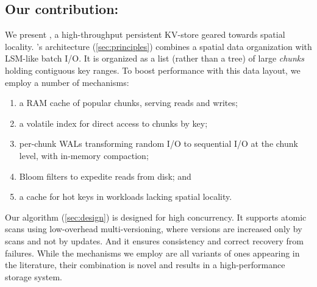 \subsection{Our contribution: \sys}

We present \sys, a high-throughput persistent KV-store geared towards spatial locality. 
\sys's  architecture (\cref{sec:principles}) 
combines a spatial data organization with LSM-like  batch I/O.
It is organized  as a list (rather than a tree) of large \emph{chunks} holding contiguous key ranges.
%
To boost performance with this data layout, we employ a number of mechanisms: 

\begin{enumerate} 
     \setlength{\itemindent}{-10pt}
\item
 a RAM cache of popular chunks, serving  reads and writes;  
\item
 a volatile index for direct access to chunks by key; 
\item
 per-chunk WALs  transforming random I/O to sequential I/O at the chunk level, with in-memory compaction; 
\item
Bloom filters to expedite reads from disk; and 
\item 
a   cache for hot keys in workloads lacking spatial locality.
\end{enumerate}

Our algorithm (\cref{sec:design}) is designed for high %
concurrency. 
It supports atomic scans using low-overhead multi-versioning, where versions are increased only by scans and not by updates. And it ensures consistency and correct recovery from failures. While the mechanisms we employ are all variants of ones appearing in the literature, their combination is novel and results in a high-performance storage system.





